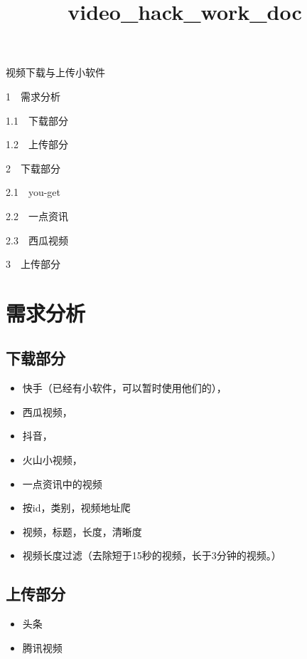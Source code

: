 \documentclass[11pt]{article}
\title{video\_hack\_work\_doc}
\providecommand{\tightlist}{%
      \setlength{\itemsep}{0pt}\setlength{\parskip}{0pt}}
\begin{document}
    
    
    \maketitle
    
    

    
    视频下载与上传小软件{}

{{1~~}需求分析}

{{1.1~~}下载部分}

{{1.2~~}上传部分}

{{2~~}下载部分}

{{2.1~~}you-get}

{{2.2~~}一点资讯}

{{2.3~~}西瓜视频}

{{3~~}上传部分}

    \section{需求分析}\label{ux9700ux6c42ux5206ux6790}

    \subsection{下载部分}\label{ux4e0bux8f7dux90e8ux5206}

\begin{itemize}
\item
  快手（已经有小软件，可以暂时使用他们的），
\item
  西瓜视频，
\item
  抖音，
\item
  火山小视频，
\item
  一点资讯中的视频
\item
  按id，类别，视频地址爬
\item
  视频，标题，长度，清晰度
\item
  视频长度过滤（去除短于15秒的视频，长于3分钟的视频。）
\end{itemize}

\subsection{上传部分}\label{ux4e0aux4f20ux90e8ux5206}

\begin{itemize}
\tightlist
\item
  头条
\item
  腾讯视频
\end{itemize}
\end{document}
